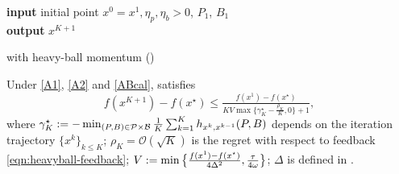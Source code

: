 \begin{algorithm}[h]
{\textbf{input} initial point $x^0 = x^1, \eta_p, \eta_b > 0$, $P_1$, $B_1$}\\
{\textbf{output} $x^{K+1}$}
\caption{{\hdm} with heavy-ball momentum (\hdmhb)\label{alg:ospolyak}}
\end{algorithm}

\begin{thm}\label{thm:heavyball}
Under \ref{A1}, \ref{A2} and \ref{ABcal},  satisfies
\begin{equation*}
  f (x^{K + 1}) - f (x^{\star}) \leq \tfrac{f (x^{1}) - f (x^{\star})}{K V \max\{ \gamma_K^{\star} - \frac{\rho_K}{K}, 0 \} + 1},
\end{equation*}
where $\gamma_{K}^{\star} := - \min_{(P, B) \in \mathcal{P} \times \mathcal{B}} \tfrac{1}{K} \sum_{k=1}^K h_{x^k, x^{k-1}}(P, B)$ depends on the iteration trajectory $\{x^k\}_{k \leq K}$; $\rho_K = \mathcal{O}(\sqrt{K})$ is the regret with respect to feedback \eqref{eqn:heavyball-feedback}; $V := \min\big\{ \tfrac{f (x^{1}) - f (x^{\star})}{4 \Delta^2}, \tfrac{\tau}{4 \omega} \big\}$; $\Delta$ is defined in .
\end{thm}

